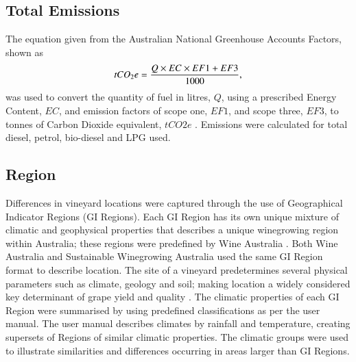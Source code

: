 \documentclass[review,12pt,authoryear]{elsarticle}
\begin{document}
\begin{linenumbers}
\subsection{Total Emissions}
The equation given from the Australian National Greenhouse Accounts Factors, shown as
\newline
\begin{equation}
\label{(1)}
    tCO_{2}e={{Q \times EC \times EF1 + EF3}\over{1000}},
\end{equation}
\newline
was used to convert the quantity of fuel in litres, $Q$, using a prescribed Energy Content, $EC$, and emission factors of scope one, $EF1$, and scope three, $EF3$, to tonnes of Carbon Dioxide equivalent, $tCO2e$ \citep{departmentofclimatechangeenergytheenvironmentandwaterAustralianNationalGreenhouse2022}. Emissions were calculated for total diesel, petrol, bio-diesel and LPG used. 
\subsection{Region}
Differences in vineyard locations were captured through the use of Geographical Indicator Regions (GI Regions). Each GI Region has its own unique mixture of climatic and geophysical properties that describes a unique winegrowing region within Australia; these regions were predefined by Wine Australia \citep{hallidayAustralianWineEncyclopedia2009,oliverReviewSoilPhysical2013,soarClimateDriversRed2008}. Both Wine Australia and Sustainable Winegrowing Australia used the same GI Region format to describe location.
\newline
The site of a vineyard predetermines several physical parameters such as climate, geology and soil; making location a widely considered key determinant of grape yield and quality \citep{abbalDecisionSupportSystem2016,agostaRegionalClimateVariability2012,fragaMultivariateClusteringViticultural2017}. The climatic properties of each GI Region were summarised by using predefined classifications as per the \citet{sustainablewinegrowingaustraliaSustainableWinegrowingAustralia2021} user manual. The user manual describes climates by rainfall and temperature, creating supersets of Regions of similar climatic properties. The climatic groups were used to illustrate similarities and differences occurring in areas larger than GI Regions.

\end{linenumbers}
\end{document}

